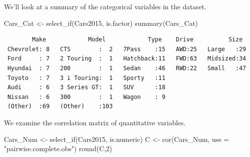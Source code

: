 \documentclass[
  letterpaper,
  DIV=11,
  numbers=noendperiod]{scrreprt}
\newenvironment{Shaded}{\begin{snugshade}}{\end{snugshade}}
\newcommand{\AttributeTok}[1]{\textcolor[rgb]{0.40,0.45,0.13}{#1}}
\newcommand{\DecValTok}[1]{\textcolor[rgb]{0.68,0.00,0.00}{#1}}
\newcommand{\FunctionTok}[1]{\textcolor[rgb]{0.28,0.35,0.67}{#1}}
\newcommand{\NormalTok}[1]{\textcolor[rgb]{0.00,0.23,0.31}{#1}}
\newcommand{\OtherTok}[1]{\textcolor[rgb]{0.00,0.23,0.31}{#1}}
\newcommand{\StringTok}[1]{\textcolor[rgb]{0.13,0.47,0.30}{#1}}
\begin{document}
We'll look at a summary of the categorical variables in the dataset.

\begin{Shaded}
\begin{Highlighting}[]
\NormalTok{Cars\_Cat }\OtherTok{\textless{}{-}} \FunctionTok{select\_if}\NormalTok{(Cars2015, is.factor)}
\FunctionTok{summary}\NormalTok{(Cars\_Cat)}
\end{Highlighting}
\end{Shaded}

\begin{verbatim}
        Make            Model            Type    Drive          Size   
 Chevrolet: 8   CTS        :  2   7Pass    :15   AWD:25   Large   :29  
 Ford     : 7   2 Touring  :  1   Hatchback:11   FWD:63   Midsized:34  
 Hyundai  : 7   200        :  1   Sedan    :46   RWD:22   Small   :47  
 Toyoto   : 7   3 i Touring:  1   Sporty   :11                         
 Audi     : 6   3 Series GT:  1   SUV      :18                         
 Nissan   : 6   300        :  1   Wagon    : 9                         
 (Other)  :69   (Other)    :103                                        
\end{verbatim}

We examine the correlation matrix of quantitative variables.

\begin{Shaded}
\begin{Highlighting}[]
\NormalTok{Cars\_Num }\OtherTok{\textless{}{-}} \FunctionTok{select\_if}\NormalTok{(Cars2015, is.numeric)}
\NormalTok{C }\OtherTok{\textless{}{-}} \FunctionTok{cor}\NormalTok{(Cars\_Num, }\AttributeTok{use =} \StringTok{"pairwise.complete.obs"}\NormalTok{)}
\FunctionTok{round}\NormalTok{(C,}\DecValTok{2}\NormalTok{)}
\end{Highlighting}
\end{Shaded}
\end{document}
